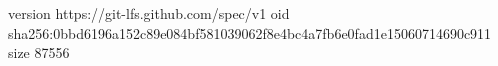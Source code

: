 version https://git-lfs.github.com/spec/v1
oid sha256:0bbd6196a152c89e084bf581039062f8e4bc4a7fb6e0fad1e15060714690c911
size 87556
